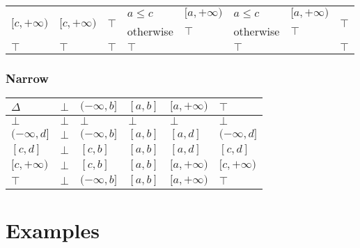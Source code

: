 \documentclass{beamer}
\begin{document}
\begin{frame}
\begin{table}[]
{\begin{tabular}{|l|l|ll|ll|ll|l|}
    \multirow{2}{*}{$[c, +\infty)$} & \multirow{2}{*}{$[c, +\infty)$} & \multicolumn{2}{l|}{\multirow{2}{*}{$\top$}}                 & $a \le c$               & $[a, +\infty)$ & $a \le c$                  & $[a, +\infty)$                  & \multirow{2}{*}{$\top$} \\
                                    &                                 & \multicolumn{2}{l|}{}      & otherwise               & $\top$         & otherwise                  & $\top$                          &                         \\ \hline
    $\top$                          & $\top$                          & \multicolumn{2}{l|}{$\top$}                                  & \multicolumn{2}{l|}{$\top$}              & \multicolumn{2}{l|}{$\top$}                                  & $\top$                  \\ \hline
    \end{tabular}}
    \end{table}
\end{frame}

\begin{frame}
    \frametitle{Narrow}
\begin{table}[]
    \begin{tabular}{|l|l|l|l|l|l|}
    \hline
    $\Delta$       & $\bot$ & $(-\infty, b]$ & $[a, b]$ & $[a, +\infty)$ & $\top$         \\ \hline
    $\bot$         & $\bot$ & $\bot$         & $\bot$   & $\bot$         & $\bot$         \\ \hline
    $(-\infty, d]$ & $\bot$ & $(-\infty, b]$ & $[a, b]$ & $[a, d]$       & $(-\infty, d]$ \\ \hline
    $[c, d]$       & $\bot$ & $[c, b]$       & $[a, b]$ & $[a, d]$       & $[c, d]$       \\ \hline
    $[c, +\infty)$ & $\bot$ & $[c, b]$       & $[a, b]$ & $[a, +\infty)$ & $[c, +\infty)$ \\ \hline
    $\top$         & $\bot$ & $(-\infty, b]$ & $[a, b]$ & $[a, +\infty)$ & $\top$         \\ \hline
    \end{tabular}
    \end{table}
\end{frame}


\section{Examples}
\end{document}
